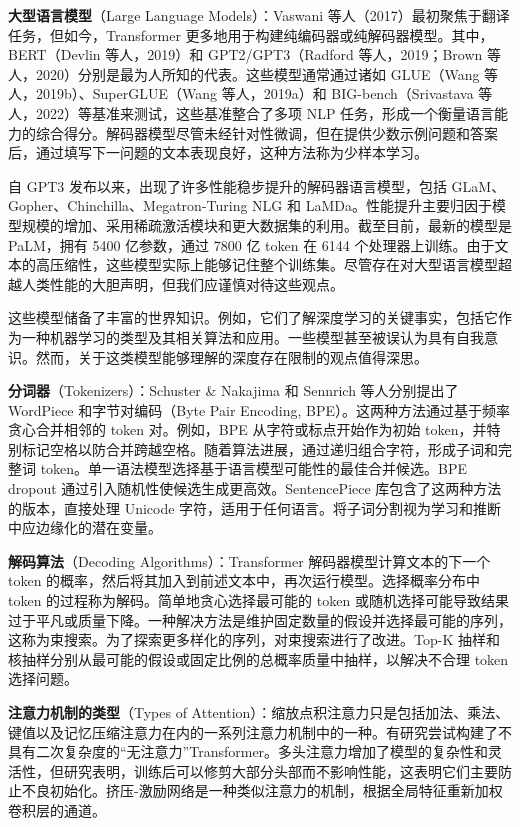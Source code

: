 \documentclass[lang=cn,newtx,10pt,scheme=chinese]{elegantbook}
\begin{document}
\textbf{大型语言模型}（Large Language Models）：Vaswani 等人（2017）最初聚焦于翻译任务，但如今，Transformer 更多地用于构建纯编码器或纯解码器模型。其中，BERT（Devlin 等人，2019）和 GPT2/GPT3（Radford 等人，2019；Brown 等人，2020）分别是最为人所知的代表。这些模型通常通过诸如 GLUE（Wang 等人，2019b）、SuperGLUE（Wang 等人，2019a）和 BIG-bench（Srivastava 等人，2022）等基准来测试，这些基准整合了多项 NLP 任务，形成一个衡量语言能力的综合得分。解码器模型尽管未经针对性微调，但在提供少数示例问题和答案后，通过填写下一问题的文本表现良好，这种方法称为少样本学习。

自 GPT3 发布以来，出现了许多性能稳步提升的解码器语言模型，包括 GLaM、Gopher、Chinchilla、Megatron-Turing NLG 和 LaMDa。性能提升主要归因于模型规模的增加、采用稀疏激活模块和更大数据集的利用。截至目前，最新的模型是 PaLM，拥有 5400 亿参数，通过 7800 亿 token 在 6144 个处理器上训练。由于文本的高压缩性，这些模型实际上能够记住整个训练集。尽管存在对大型语言模型超越人类性能的大胆声明，但我们应谨慎对待这些观点。

这些模型储备了丰富的世界知识。例如，它们了解深度学习的关键事实，包括它作为一种机器学习的类型及其相关算法和应用。一些模型甚至被误认为具有自我意识。然而，关于这类模型能够理解的深度存在限制的观点值得深思。

\textbf{分词器}（Tokenizers）：Schuster \& Nakajima 和 Sennrich 等人分别提出了 WordPiece 和字节对编码（Byte Pair Encoding, BPE）。这两种方法通过基于频率贪心合并相邻的 token 对。例如，BPE 从字符或标点开始作为初始 token，并特别标记空格以防合并跨越空格。随着算法进展，通过递归组合字符，形成子词和完整词 token。单一语法模型选择基于语言模型可能性的最佳合并候选。BPE dropout 通过引入随机性使候选生成更高效。SentencePiece 库包含了这两种方法的版本，直接处理 Unicode 字符，适用于任何语言。将子词分割视为学习和推断中应边缘化的潜在变量。

\textbf{解码算法}（Decoding Algorithms）：Transformer 解码器模型计算文本的下一个 token 的概率，然后将其加入到前述文本中，再次运行模型。选择概率分布中 token 的过程称为解码。简单地贪心选择最可能的 token 或随机选择可能导致结果过于平凡或质量下降。一种解决方法是维护固定数量的假设并选择最可能的序列，这称为束搜索。为了探索更多样化的序列，对束搜索进行了改进。Top-K 抽样和核抽样分别从最可能的假设或固定比例的总概率质量中抽样，以解决不合理 token 选择问题。

\textbf{注意力机制的类型}（Types of Attention）：缩放点积注意力只是包括加法、乘法、键值以及记忆压缩注意力在内的一系列注意力机制中的一种。有研究尝试构建了不具有二次复杂度的“无注意力”Transformer。多头注意力增加了模型的复杂性和灵活性，但研究表明，训练后可以修剪大部分头部而不影响性能，这表明它们主要防止不良初始化。挤压-激励网络是一种类似注意力的机制，根据全局特征重新加权卷积层的通道。
\end{document}
